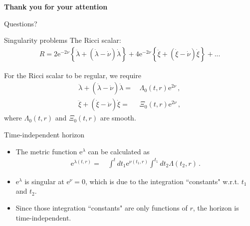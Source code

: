 \documentclass[english]{beamer}
\newcommand{\e}{\mathrm{e}}
\begin{document}
\appendix
{}
\begin{frame}[noframenumbering]
\Large
\begin{center}
\textbf{Thank you for your attention}

\vspace{50pt}
Questions?
\end{center}
\end{frame}


\begin{frame}[noframenumbering] %
\end{frame}


\begin{frame}{Singularity problems}
    The Ricci scalar:
    \begin{align*}
    R= 2 \e^{-2 \nu} \left\{\ddot\lambda + \left( \dot\lambda - \dot\nu \right) \dot\lambda \right\} + 4 \e^{-2\nu} \left\{ \ddot\xi + \left(\dot\xi - \dot\nu \right) \dot \xi \right\} + ...
    \end{align*}

    For the Ricci scalar to be regular, we require
    \begin{align}
    \ddot\lambda + \left( \dot\lambda - \dot\nu \right) \dot\lambda =&\, \Lambda_0 \left(t, r\right) \e^{2\nu}\, , \\
    \ddot\xi + \left(\dot\xi - \dot\nu \right) \dot \xi =&\, \Xi_0 \left(t, r\right) \e^{2\nu}\,, 
    \end{align}
    where $\Lambda_0\left(t, r\right)$ and $\Xi_0\left(t, r\right)$ are smooth.
\end{frame}


\begin{frame}{Time-independent horizon}
    \begin{itemize}
        \item The metric function $\e^\lambda$ can be calculated as
        \begin{align}
        \e^{\lambda (t,r)} =&\, \int^t dt_1 \e^{\nu\left(t_1, r\right)} \int^{t_1} dt_2 \Lambda \left(t_2, r\right)\,.
        \end{align}

        \item $\e^\lambda$ is singular at $\e^\nu=0$, which is due to the integration ``constants" w.r.t. $t_1$ and $t_2$.
        
        \item Since those integration ``constants" are only functions of $r$, the horizon is time-independent.
        \end{itemize}
\end{frame}


 \begin{frame}[allowframebreaks]
    \printbibliography
 \end{frame} 
\end{document}
